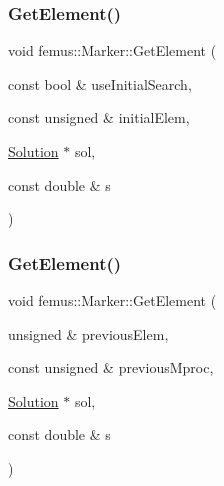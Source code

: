 \mbox{\label{classfemus_1_1_marker_a6bdbbae6d9f6ad313b94b505e92d1e15}} 
\subsubsection{\texorpdfstring{Get\+Element()}{GetElement()}\hspace{0.1cm}{\footnotesize\ttfamily [1/2]}}
{\footnotesize\ttfamily void femus\+::\+Marker\+::\+Get\+Element (\begin{DoxyParamCaption}\item[{const bool \&}]{use\+Initial\+Search,  }\item[{const unsigned \&}]{initial\+Elem,  }\item[{\mbox{\hyperlink{classfemus_1_1_solution}{Solution}} $\ast$}]{sol,  }\item[{const double \&}]{s }\end{DoxyParamCaption})}

\mbox{\label{classfemus_1_1_marker_ab3666724a2f8b99d7a4fe2212fd4b385}} 
\subsubsection{\texorpdfstring{Get\+Element()}{GetElement()}\hspace{0.1cm}{\footnotesize\ttfamily [2/2]}}
{\footnotesize\ttfamily void femus\+::\+Marker\+::\+Get\+Element (\begin{DoxyParamCaption}\item[{unsigned \&}]{previous\+Elem,  }\item[{const unsigned \&}]{previous\+Mproc,  }\item[{\mbox{\hyperlink{classfemus_1_1_solution}{Solution}} $\ast$}]{sol,  }\item[{const double \&}]{s }\end{DoxyParamCaption})}

\mbox{\label{classfemus_1_1_marker_a1ac39140dc5ae49f5c09f4637e31e2bb}} 
